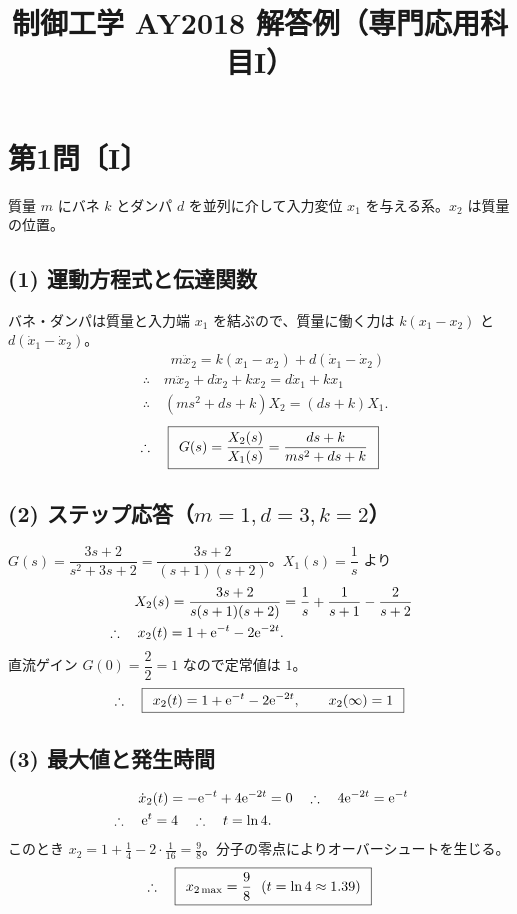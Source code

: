 \documentclass[11pt,a4paper]{article}
\title{制御工学 AY2018 解答例（専門応用科目I）}
\author{}
\date{}
\begin{document}
\maketitle

\section*{第1問〔I〕}

質量 $m$ にバネ $k$ とダンパ $d$ を並列に介して入力変位 $x_1$ を与える系。$x_2$ は質量の位置。

\subsection*{(1) 運動方程式と伝達関数}
バネ・ダンパは質量と入力端 $x_1$ を結ぶので、質量に働く力は $k(x_1-x_2)$ と $d(\dot x_1-\dot x_2)$。
\begin{align*}
  &\qquad m\ddot{x}_2=k(x_1-x_2)+d(\dot{x}_1-\dot{x}_2)\\
  &\therefore\quad m\ddot{x}_2+d\dot{x}_2+kx_2=d\dot{x}_1+kx_1\\
  &\therefore\quad (ms^2+ds+k)X_2=(ds+k)X_1.
\end{align*}
\[
  \therefore\quad \boxed{\,\;G(s)=\dfrac{X_2(s)}{X_1(s)}=\dfrac{ds+k}{ms^2+ds+k}\;\,}
\]

\subsection*{(2) ステップ応答（$m=1,d=3,k=2$）}
$G(s)=\dfrac{3s+2}{s^2+3s+2}=\dfrac{3s+2}{(s+1)(s+2)}$。$X_1(s)=\dfrac1s$ より
\begin{align*}
  &\qquad X_2(s)=\frac{3s+2}{s(s+1)(s+2)}
   =\frac{1}{s}+\frac{1}{s+1}-\frac{2}{s+2}\\
  &\therefore\quad x_2(t)=1+\mathrm{e}^{-t}-2\mathrm{e}^{-2t}.
\end{align*}
直流ゲイン $G(0)=\dfrac{2}{2}=1$ なので定常値は $1$。
\[
  \therefore\quad \boxed{\,\;x_2(t)=1+\mathrm{e}^{-t}-2\mathrm{e}^{-2t},\qquad x_2(\infty)=1\;\,}
\]

\subsection*{(3) 最大値と発生時間}
\begin{align*}
  &\qquad \dot{x}_2(t)=-\mathrm{e}^{-t}+4\mathrm{e}^{-2t}=0
   \quad\therefore\quad 4\mathrm{e}^{-2t}=\mathrm{e}^{-t}\\
  &\therefore\quad \mathrm{e}^{t}=4
   \quad\therefore\quad t=\ln 4.
\end{align*}
このとき $x_2=1+\tfrac14-2\cdot\tfrac{1}{16}=\tfrac98$。分子の零点によりオーバーシュートを生じる。
\[
  \therefore\quad \ans{\;x_{2\max}=\dfrac98\ \ (t=\ln4\approx1.39)\;}
\]
\end{document}

